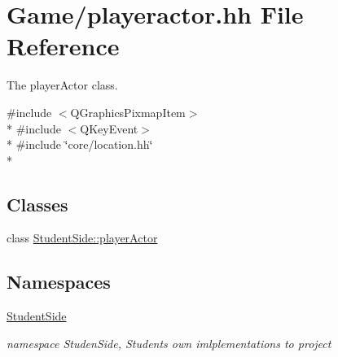 \hypertarget{playeractor_8hh}{\section{Game/playeractor.hh File Reference}
\label{playeractor_8hh}
}


The player\-Actor class.  


{\ttfamily \#include $<$Q\-Graphics\-Pixmap\-Item$>$}\\*
{\ttfamily \#include $<$Q\-Key\-Event$>$}\\*
{\ttfamily \#include \char`\"{}core/location.\-hh\char`\"{}}\\*
\subsection*{Classes}
\begin{DoxyCompactItemize}
\item 
class \hyperlink{class_student_side_1_1player_actor}{Student\-Side\-::player\-Actor}
\end{DoxyCompactItemize}
\subsection*{Namespaces}
\begin{DoxyCompactItemize}
\item 
\hyperlink{namespace_student_side}{Student\-Side}
\begin{DoxyCompactList}\small\item\em namespace Studen\-Side, Students own imlplementations to project \end{DoxyCompactList}\end{DoxyCompactItemize}
